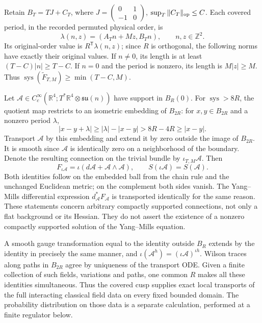 \documentclass[
  11pt,
]{article}
\begin{document}
Retain \(B_T=TJ+C_T\), where
\(J=\left(\begin{smallmatrix}0&1\\-1&0\end{smallmatrix}\right)\),
\(\sup_T\|C_T\|_{\rm op}\leq C\). Each covered period, in the recorded
permuted physical order, is \[
 \lambda(n,z)=(A_Tn+Mz,B_Tn),\qquad n,z\in\mathbb Z^2.
\] Its original-order value is \(R^{\mathsf T}\lambda(n,z)\); since
\(R\) is orthogonal, the following norms have exactly their original
values. If \(n\ne0\), its length is at least \((T-C)|n|\geq T-C\). If
\(n=0\) and the period is nonzero, its length is \(M|z|\geq M\). Thus
\(\operatorname{sys}(\widetilde F_{T,M})\geq\min(T-C,M)\).

Let \(\mathscr A\in C_c^\infty(\mathbb R^4;
T^*\mathbb R^4\otimes\mathfrak{su}(n))\) have support in \(B_R(0)\). For
\(\operatorname{sys}>8R\), the quotient map restricts to an isometric
embedding of \(B_{2R}\): for \(x,y\in B_{2R}\) and a nonzero period
\(\lambda\), \[
 |x-y+\lambda|\geq|\lambda|-|x-y|>8R-4R\geq|x-y|.
\] Transport \(\mathscr A\) by this embedding and extend it by zero
outside the image of \(B_{2R}\). It is smooth since \(\mathscr A\) is
identically zero on a neighborhood of the boundary. Denote the resulting
connection on the trivial bundle by \(\iota_{T,M}\mathscr A\). Then \[
 F_{\iota\mathscr A}=\iota(d\mathscr A+\mathscr A\wedge\mathscr A),
 \qquad S(\iota\mathscr A)=S(\mathscr A).
\] Both identities follow on the embedded ball from the chain rule and
the unchanged Euclidean metric; on the complement both sides vanish. The
Yang--Mills differential expression \(d_{\mathscr A}^*F_{\mathscr A}\)
is transported identically for the same reason. These statements concern
arbitrary compactly supported connections, not only a flat background or
its Hessian. They do not assert the existence of a nonzero compactly
supported solution of the Yang--Mills equation.

A smooth gauge transformation equal to the identity outside \(B_R\)
extends by the identity in precisely the same manner, and
\(\iota(\mathscr A^h)=(\iota\mathscr A)^{\iota h}\). Wilson traces along
paths in \(B_{2R}\) agree by uniqueness of the transport ODE. Given a
finite collection of such fields, variations and paths, one common \(R\)
makes all these identities simultaneous. Thus the covered cusp supplies
exact local transports of the full interacting classical field data on
every fixed bounded domain. The probability distribution on those data
is a separate calculation, performed at a finite regulator below.
\end{document}
